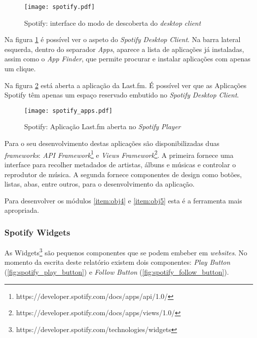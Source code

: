      \begin{figure}
        \begin{center}
          \texttt{[image: spotify.pdf]}
        \end{center}
        \caption{Spotify: interface do modo de descoberta do \emph{desktop client}}
        \label{fig:spotify_apps}
      \end{figure}

      Na figura \ref{fig:spotify_apps} é possível ver o aspeto do \emph{Spotify Desktop Client}.
      Na barra lateral esquerda, dentro do separador \emph{Apps}, aparece a lista de aplicações já instaladas, assim como o \emph{App Finder}, que permite procurar e instalar aplicações com apenas um clique.
 
      Na figura \ref{fig:spotify_apps2} está aberta a aplicação da Last.fm. É possível ver que as Aplicações Spotify têm apenas um espaço reservado embutido no \emph{Spotify Desktop Client}.

      \begin{figure}
        \begin{center}
          \texttt{[image: spotify\_apps.pdf]}
        \end{center}
        \caption{Spotify: Aplicação Last.fm aberta no \emph{Spotify Player}}
        \label{fig:spotify_apps2}
      \end{figure}

      Para o seu desenvolvimento destas aplicações são disponibilizadas duas \emph{frameworks}: \emph{API Framework}\footnote{https://developer.spotify.com/docs/apps/api/1.0/} e \emph{Views Framework}\footnote{https://developer.spotify.com/docs/apps/views/1.0/}.
      A primeira fornece uma interface para recolher metadados de artistas, álbuns e músicas e controlar o reprodutor de música.
      A segunda fornece componentes de design como botões, listas, abas, entre outros, para o desenvolvimento da aplicação.

      Para desenvolver os módulos \ref{item:obj4} e \ref{item:obj5} esta é a ferramenta mais apropriada.



    \subsubsection{Spotify Widgets} %
    \label{ssub:spotify_widgets}
      As Widgets\footnote{https://developer.spotify.com/technologies/widgets} são pequenos componentes que se podem embeber em \emph{websites}.
      No momento da escrita deste relatório existem dois componentes: \emph{Play Button} (\ref{fig:spotify_play_button}) e \emph{Follow Button} (\ref{fig:spotify_follow_button}).

